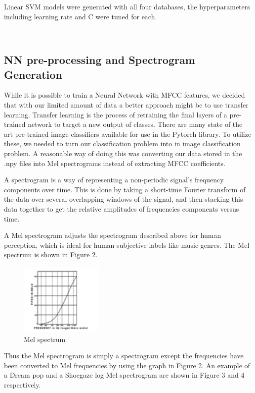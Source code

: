 \documentclass[letterpaper, 12 pt, conference]{ieeeconf}  %
\begin{document}
Linear SVM models were generated with all four databases, the hyperparameters including learning rate and C were tuned for each. 

\newline \,\,

\subsection{NN pre-processing and Spectrogram Generation}

While it is possible to train a Neural Network with MFCC features, we decided that with our limited amount of data a better approach might be to use transfer learning. Transfer learning is the process of retraining the final layers of a pre-trained network to target a new output of classes. There are many state of the art pre-trained image classifiers available for use in the Pytorch library. To utilize these, we needed to turn our classification problem into in image classification problem. A reasonable way of doing this was converting our data stored in the .npy files into Mel spectrograms instead of extracting MFCC coefficients.

A spectrogram is a way of representing a non-periodic signal’s frequency components over time. This is done by taking a short-time Fourier transform of the data over several overlapping windows of the signal, and then stacking this data together to get the relative amplitudes of frequencies components versus time. 

A Mel spectrogram adjusts the spectrogram described above for human perception, which is ideal for human subjective labels like music genres. The Mel spectrum is shown in Figure 2.

\begin{figure}
\begin{center}
    \includegraphics[width=4cm]{melspectrum.png}
\caption{Mel spectrum}
\end{center}

\end{figure}


Thus the Mel spectrogram is simply a spectrogram except the frequencies have been converted to Mel frequencies by using the graph in Figure 2. An example of a Dream pop and a Shoegaze log Mel spectrogram are shown in Figure 3 and 4 respectively.
\end{document}

